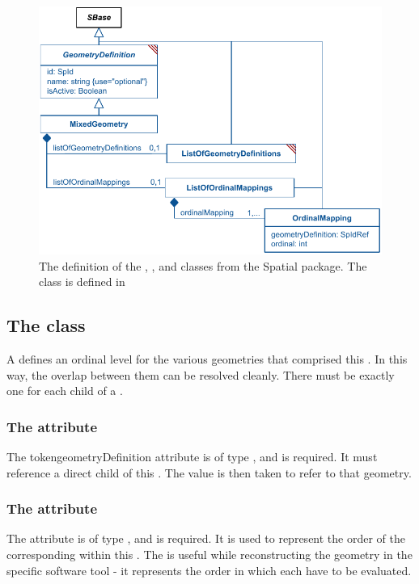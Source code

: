 \begin{figure}[ht]
  \includegraphics{figs/MixedGeometry-uml}
  \caption{The definition of the \MixedGeometry, \ListOfOrdinalMappings, and \OrdinalMapping classes from the Spatial package.  The \ListOfGeometryDefinitions class is defined in }
  \label{mixedgeometry-uml}
\end{figure}

\subsection{The  class}
\label{ordinalmapping-class}
A \OrdinalMapping defines an ordinal level for the various geometries that comprised this \MixedGeometry.  In this way, the overlap between them can be resolved cleanly.  There must be exactly one \OrdinalMapping for each child \GeometryDefinition of a \MixedGeometry.


\subsubsection{The \fixttspace{} attribute}
The token{geometryDefinition} attribute is of type , and is required.  It must reference a direct child \GeometryDefinition of this \MixedGeometry.  The  value is then taken to refer to that geometry.


\subsubsection{The \fixttspace{} attribute}
The  attribute is of type , and is required. It is used to represent the order of the corresponding \GeometryDefinition within this \MixedGeometry.  The  is useful while reconstructing the geometry in the specific software tool - it represents the order in which each \GeometryDefinition have to be evaluated.


